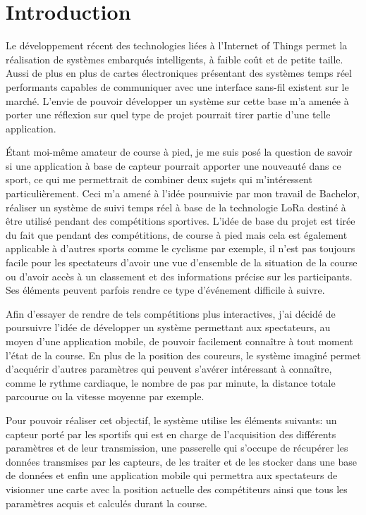 \chapter{Introduction}

Le développement récent des technologies liées à l'Internet of Things permet la réalisation de systèmes embarqués intelligents, à faible coût et de petite taille. Aussi de plus en plus de cartes électroniques présentant des systèmes temps réel performants capables de communiquer avec une interface sans-fil existent sur le marché. L'envie de pouvoir développer un système sur cette base m'a amenée à porter une réflexion sur quel type de projet pourrait tirer partie d'une telle application. 

Étant moi-même amateur de course à pied, je me suis posé la question de savoir si une application à base de capteur pourrait apporter une nouveauté dans ce sport, ce qui me permettrait de combiner deux sujets qui m'intéressent particulièrement. Ceci m'a amené à l'idée poursuivie par mon travail de Bachelor, réaliser un système de suivi temps réel à base de la technologie LoRa destiné à être utilisé pendant des compétitions sportives. L'idée de base du projet est tirée du fait que pendant des compétitions, de course à pied mais cela est également applicable à d'autres sports comme le cyclisme par exemple, il n'est pas toujours facile pour les spectateurs d'avoir une vue d'ensemble de la situation de la course ou d’avoir accès à un classement et des informations précise sur les participants. Ses éléments peuvent parfois rendre ce type d'événement difficile à suivre.

Afin d'essayer de rendre de tels compétitions plus interactives, j'ai décidé de poursuivre l'idée de développer un système permettant aux spectateurs, au moyen d'une application mobile, de pouvoir facilement connaître à tout moment l'état de la course. En plus de la position des coureurs, le système imaginé permet d'acquérir d'autres paramètres qui peuvent s'avérer intéressant à connaître, comme le rythme cardiaque, le nombre de pas par minute, la distance totale parcourue ou la vitesse moyenne par exemple.

Pour pouvoir réaliser cet objectif, le système utilise les éléments suivants: un capteur porté par les sportifs qui est en charge de l'acquisition des différents paramètres et de leur transmission, une passerelle qui s'occupe de récupérer les données transmises par les capteurs, de les traiter et de les stocker dans une base de données et enfin une application mobile qui permettra aux spectateurs de visionner une carte avec la position actuelle des compétiteurs ainsi que tous les paramètres acquis et calculés durant la course.

